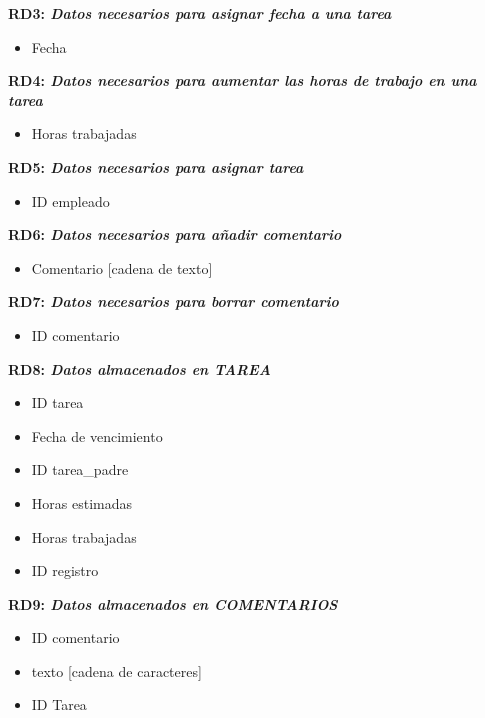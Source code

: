 \documentclass[paper=a4, fontsize=11pt, spanish]{scrartcl}
\begin{document}
\setlength{\parindent}{0em}
\textbf{RD3: \textit{Datos necesarios para asignar fecha a una tarea}}
\setlength{\parindent}{2em}
\begin{itemize}
\item Fecha
\end{itemize}

\setlength{\parindent}{0em}
\textbf{RD4: \textit{Datos necesarios para aumentar las horas de trabajo en una tarea}}
\setlength{\parindent}{2em}
\begin{itemize}
\item Horas trabajadas
\end{itemize}

\setlength{\parindent}{0em}
\textbf{RD5: \textit{Datos necesarios para asignar tarea}}
\setlength{\parindent}{2em}
\begin{itemize}
\item ID empleado
\end{itemize}

\setlength{\parindent}{0em}
\textbf{RD6: \textit{Datos necesarios para añadir comentario}}
\setlength{\parindent}{2em}
\begin{itemize}
\item Comentario [cadena de texto]
\end{itemize}

\setlength{\parindent}{0em}
\textbf{RD7: \textit{Datos necesarios para borrar comentario}}
\setlength{\parindent}{2em}
\begin{itemize}
\item ID comentario
\end{itemize}

\setlength{\parindent}{0em}
\textbf{RD8: \textit{Datos almacenados en TAREA}}
\setlength{\parindent}{2em}
\begin{itemize}
\item ID tarea
\item Fecha de vencimiento
\item ID tarea\_padre
\item Horas estimadas
\item Horas trabajadas
\item ID registro
\end{itemize}

\setlength{\parindent}{0em}
\textbf{RD9: \textit{Datos almacenados en COMENTARIOS}}
\setlength{\parindent}{2em}
\begin{itemize}
\item ID comentario
\item texto [cadena de caracteres]
\item ID Tarea
\end{itemize}
\end{document}
